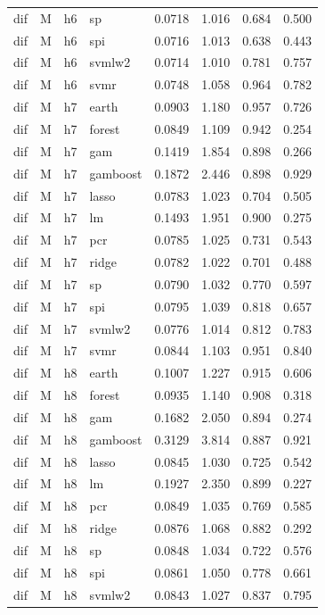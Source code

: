 \begin{ThreePartTable}
\begin{longtable}[t]{llclcccc}
dif & M & h6 & sp & 0.0718 & 1.016 & 0.684 & 0.500\\
dif & M & h6 & spi & 0.0716 & 1.013 & 0.638 & 0.443\\
dif & M & h6 & svmlw2 & 0.0714 & 1.010 & 0.781 & 0.757\\
dif & M & h6 & svmr & 0.0748 & 1.058 & 0.964 & 0.782\\
\addlinespace
dif & M & h7 & earth & 0.0903 & 1.180 & 0.957 & 0.726\\
dif & M & h7 & forest & 0.0849 & 1.109 & 0.942 & 0.254\\
dif & M & h7 & gam & 0.1419 & 1.854 & 0.898 & 0.266\\
dif & M & h7 & gamboost & 0.1872 & 2.446 & 0.898 & 0.929\\
dif & M & h7 & lasso & 0.0783 & 1.023 & 0.704 & 0.505\\
dif & M & h7 & lm & 0.1493 & 1.951 & 0.900 & 0.275\\
dif & M & h7 & pcr & 0.0785 & 1.025 & 0.731 & 0.543\\
dif & M & h7 & ridge & 0.0782 & 1.022 & 0.701 & 0.488\\
dif & M & h7 & sp & 0.0790 & 1.032 & 0.770 & 0.597\\
dif & M & h7 & spi & 0.0795 & 1.039 & 0.818 & 0.657\\
dif & M & h7 & svmlw2 & 0.0776 & 1.014 & 0.812 & 0.783\\
dif & M & h7 & svmr & 0.0844 & 1.103 & 0.951 & 0.840\\
\addlinespace
dif & M & h8 & earth & 0.1007 & 1.227 & 0.915 & 0.606\\
dif & M & h8 & forest & 0.0935 & 1.140 & 0.908 & 0.318\\
dif & M & h8 & gam & 0.1682 & 2.050 & 0.894 & 0.274\\
dif & M & h8 & gamboost & 0.3129 & 3.814 & 0.887 & 0.921\\
dif & M & h8 & lasso & 0.0845 & 1.030 & 0.725 & 0.542\\
dif & M & h8 & lm & 0.1927 & 2.350 & 0.899 & 0.227\\
dif & M & h8 & pcr & 0.0849 & 1.035 & 0.769 & 0.585\\
dif & M & h8 & ridge & 0.0876 & 1.068 & 0.882 & 0.292\\
dif & M & h8 & sp & 0.0848 & 1.034 & 0.722 & 0.576\\
dif & M & h8 & spi & 0.0861 & 1.050 & 0.778 & 0.661\\
dif & M & h8 & svmlw2 & 0.0843 & 1.027 & 0.837 & 0.795\\

\end{longtable}
\end{ThreePartTable}
